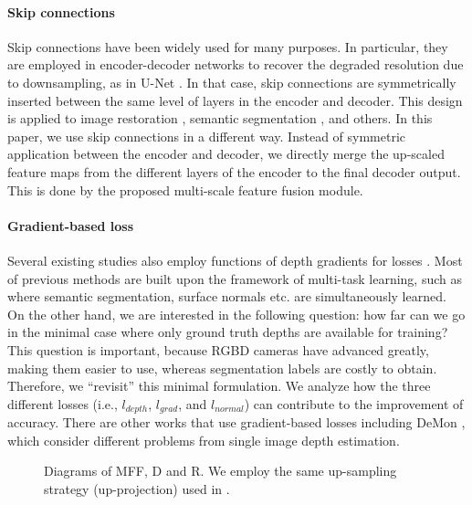 \documentclass[10pt,twocolumn,letterpaper]{article}
\begin{document}
\paragraph{Skip connections} 
Skip connections have been widely used for many purposes. In particular, they are employed in encoder-decoder networks to recover the degraded resolution due to downsampling, as in U-Net \cite{drozdzal2016importance}.
In that case, skip connections are symmetrically inserted between the same level of layers in the encoder and decoder.
This design is applied to image restoration \cite{Mao2016ImageRU} , semantic segmentation \cite{jiang2018rednet}, and others. 
In this paper, we use skip connections in a different way. Instead of symmetric application between the encoder and decoder, we directly merge the up-scaled feature maps from the different layers of the encoder to the final decoder output. This is done by the proposed multi-scale feature fusion module.

\paragraph{Gradient-based loss} Several existing studies also employ functions of depth gradients for losses \cite{Eigen2015PredictingDS,ummenhofer2017demon}.
Most of previous methods are built upon the framework of multi-task learning, such as \cite{Eigen2015PredictingDS,wang2016surge} where semantic segmentation, surface normals etc. are simultaneously learned.
On the other hand, we are interested in the following question: how far can we go in the minimal case where only ground truth depths
are available for training? This question is important, because RGBD cameras have
advanced greatly, making them easier to use, whereas segmentation labels are costly to
obtain.
Therefore, we “revisit” this minimal
formulation. We
analyze how the three different losses (i.e., $l_{depth}$, $l_{grad}$, and $l_{normal}$) can contribute to the
improvement of accuracy. There are other works that use gradient-based losses including DeMon \cite{ummenhofer2017demon}, which consider different problems from single image depth estimation.

\begin{figure}[ht]
\centering
{}
\caption{Diagrams of MFF, D and R. We employ the same up-sampling strategy (up-projection) used in \cite{laina2016deeper}.
} 
\label{fig_module}
\end{figure}
\end{document}
